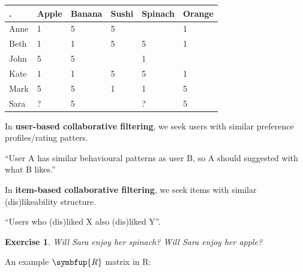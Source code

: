 \documentclass[10pt,b5paper,krantz1]{krantz}
\newtheorem{exercise}{Exercise}[chapter]
\renewcommand{\mathbf}[1]{\symbfup{#1}}
\renewenvironment{quote}{\begin{VF}}{\end{VF}}
\begin{document}
\begin{longtable}[]{@{}llllll@{}}
\toprule
. & Apple & Banana & Sushi & Spinach & Orange\tabularnewline
\midrule
\endhead
Anne & 1 & 5 & 5 & & 1\tabularnewline
Beth & 1 & 1 & 5 & 5 & 1\tabularnewline
John & 5 & 5 & & 1 &\tabularnewline
Kate & 1 & 1 & 5 & 5 & 1\tabularnewline
Mark & 5 & 5 & 1 & 1 & 5\tabularnewline
Sara & ? & 5 & & ? & 5\tabularnewline
\bottomrule
\end{longtable}

In \textbf{user-based collaborative filtering}, we seek users with similar
preference profiles/rating patters.

\begin{quote}
``User A has similar behavioural patterns as user B, so A should suggested
with what B likes.''
\end{quote}

In \textbf{item-based collaborative filtering}, we seek items with similar (dis)likeability
structure.

\begin{quote}
``Users who (dis)liked X also (dis)liked Y''.
\end{quote}

\begin{exercise}

Will Sara enjoy her spinach? Will Sara enjoy her apple?

\end{exercise}

An example \(\mathbf{R}\) matrix in R:
\end{document}
